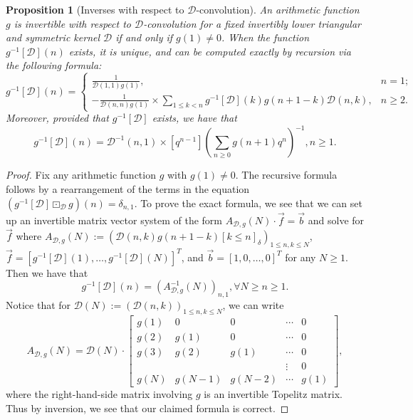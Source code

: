 \documentclass[12pt,reqno,a4letter]{article}
\numberwithin{figure}{section}
\numberwithin{table}{section}
\numberwithin{equation}{section}
\newcommand{\Iverson}[1]{\ensuremath{\left[#1\right]_{\delta}}}
\theoremstyle{plain}
\newtheorem{prop}[theorem]{Proposition}
\numberwithin{theorem}{section}
\theoremstyle{definition}
\begin{document}
\begin{prop}[Inverses with respect to $\mathcal{D}$-convolution] 
An arithmetic function $g$ is invertible with respect to $\mathcal{D}$-convolution for a fixed invertibly 
lower triangular and symmetric kernel $\mathcal{D}$ if and only if 
$g(1) \neq 0$. When the function $g^{-1}[\mathcal{D}](n)$ exists, it is unique, and 
can be computed exactly by recursion via the following formula: 
\[
g^{-1}[\mathcal{D}](n) = \begin{cases} 
     \frac{1}{\mathcal{D}(1, 1) g(1)}, & n = 1; \\ 
     -\frac{1}{\mathcal{D}(n, n) g(1)} \times \sum\limits_{1 \leq k < n} 
     g^{-1}[\mathcal{D}](k) g(n+1-k) \mathcal{D}(n, k), & n \geq 2. 
\end{cases} 
\]
Moreover, provided that $g^{-1}[\mathcal{D}]$ exists, we have that 
\[
g^{-1}[\mathcal{D}](n) = \mathcal{D}^{-1}(n, 1) \times 
     [q^{n-1}]\left(\sum_{n \geq 0} g(n+1) q^n\right)^{-1}, n \geq 1. 
\]
\end{prop}
\begin{proof}
Fix any arithmetic function $g$ with $g(1) \neq 0$. 
The recursive formula follows by a rearrangement of the terms in the 
equation $(g^{-1}[\mathcal{D}] \boxdot_{\mathcal{D}} g)(n) = \delta_{n,1}$. 
To prove the exact formula, we see that we can set up an invertible matrix vector system of 
the form $A_{\mathcal{D},g}(N) \cdot \vec{f} = \vec{b}$ and solve for $\vec{f}$ where 
$A_{\mathcal{D},g}(N) := (\mathcal{D}(n, k) g(n+1-k) \Iverson{k \leq n})_{1 \leq n,k \leq N}$, 
$\vec{f} = [g^{-1}[\mathcal{D}](1), \ldots, g^{-1}[\mathcal{D}](N)]^{T}$, and 
$\vec{b} = [1, 0, \ldots, 0]^{T}$ for any $N \geq 1$. 
Then we have that 
$$g^{-1}[\mathcal{D}](n) = (A_{\mathcal{D},g}^{-1}(N))_{n,1}, \forall N \geq n \geq 1.$$
Notice that for $\mathcal{D}(N) := (\mathcal{D}(n,k))_{1 \leq n,k \leq N}$, we can write 
\[
A_{\mathcal{D},g}(N) = \mathcal{D}(N) \cdot \begin{bmatrix} 
     g(1) & 0 & 0 & \cdots & 0 \\ 
     g(2) & g(1) & 0 & \cdots & 0 \\ 
     g(3) & g(2) & g(1) & \cdots & 0 \\ 
          &      &      & \vdots & 0 \\ 
     g(N) & g(N-1) & g(N-2) & \cdots & g(1) 
\end{bmatrix},
\]
where the right-hand-side matrix involving $g$ is an invertible Topelitz matrix. 
Thus by inversion, we see that our claimed formula is correct. 
\end{proof}
\end{document}
